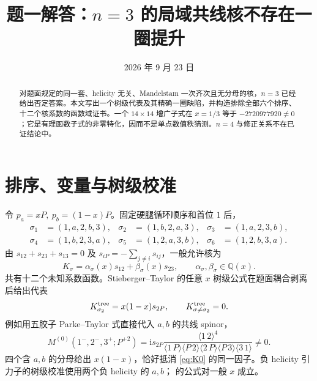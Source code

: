 \documentclass[UTF8,a4paper,11pt]{ctexart}
\title{题一解答：\(n=3\) 的局域共线核不存在一圈提升}
\author{}
\date{2026 年 9 月 23 日}
\newcommand{\ag}[2]{\langle #1\,#2\rangle}
\newcommand{\ii}{\mathrm i}
\begin{document}
\maketitle
\begin{abstract}
对题面规定的同一套、helicity 无关、Mandelstam 一次齐次且无分母的核，\(n=3\) 已经给出否定答案。本文写出一个树级代表及其精确一圈缺陷，并构造排除全部六个排序、十二个核系数的函数域证书。一个 \(14\times14\) 增广子式在 \(x=1/3\) 等于 \(-2720977920\neq0\)；它是有理函数子式的非零特化，因而不是单点数值秩猜测。\(n=4\) 与修正关系不在已证结论中。
\end{abstract}

\section{排序、变量与树级校准}
令 \(p_a=xP,\ p_b=(1-x)P\)。固定硬腿循环顺序和首位 \(1\) 后，
\begin{align}
\sigma_1&=(1,a,2,b,3),&\sigma_2&=(1,b,2,a,3),&
\sigma_3&=(1,a,2,3,b),\nonumber\\
\sigma_4&=(1,b,2,3,a),&\sigma_5&=(1,2,a,3,b),&
\sigma_6&=(1,2,b,3,a).
\end{align}
由 \(s_{12}+s_{23}+s_{13}=0\) 及 \(s_{iP}=-\sum_{j\ne i}s_{ij}\)，一般允许核为
\begin{equation}
K_\sigma=\alpha_\sigma(x)s_{12}+\beta_\sigma(x)s_{23},
\qquad \alpha_\sigma,\beta_\sigma\in\mathbb Q(x).
\label{eq:K}
\end{equation}
共有十二个未知系数函数。Stieberger--Taylor 的任意 \(x\) 树级公式在题面耦合剥离后给出代表 \cite{ST}
\begin{equation}
K^{\rm tree}_{\sigma_2}=x(1-x)s_{2P},\qquad K^{\rm tree}_{\sigma\ne\sigma_2}=0.
\label{eq:K0}
\end{equation}
例如用五胶子 Parke--Taylor 式直接代入 \(a,b\) 的共线 spinor，
\begin{equation}
M^{(0)}(1^-,2^-,3^+;P^{+2})
=\ii s_{2P}
\frac{\ag12^4}{\ag1P\ag P2\ag2P\ag P3\ag31}\ne0.
\label{eq:tree}
\end{equation}
四个含 \(a,b\) 的分母给出 \(x(1-x)\)，恰好抵消 \eqref{eq:K0} 的同一因子。负 helicity 引力子的树级校准使用两个负 helicity 的 \(a,b\)；\cite{ST} 的公式对一般 \(x\) 成立。
\end{document}
